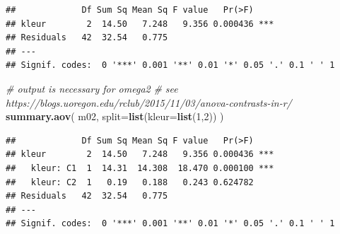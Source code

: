 \documentclass[
]{book}
\newenvironment{Shaded}{\begin{snugshade}}{\end{snugshade}}
\newcommand{\CommentTok}[1]{\textcolor[rgb]{0.56,0.35,0.01}{\textit{#1}}}
\newcommand{\DataTypeTok}[1]{\textcolor[rgb]{0.13,0.29,0.53}{#1}}
\newcommand{\DecValTok}[1]{\textcolor[rgb]{0.00,0.00,0.81}{#1}}
\newcommand{\KeywordTok}[1]{\textcolor[rgb]{0.13,0.29,0.53}{\textbf{#1}}}
\newcommand{\NormalTok}[1]{#1}
\newcommand{\OperatorTok}[1]{\textcolor[rgb]{0.81,0.36,0.00}{\textbf{#1}}}
\newcommand{\StringTok}[1]{\textcolor[rgb]{0.31,0.60,0.02}{#1}}
\begin{document}
\begin{Shaded}
\end{Shaded}

\begin{verbatim}
##             Df Sum Sq Mean Sq F value   Pr(>F)    
## kleur        2  14.50   7.248   9.356 0.000436 ***
## Residuals   42  32.54   0.775                     
## ---
## Signif. codes:  0 '***' 0.001 '**' 0.01 '*' 0.05 '.' 0.1 ' ' 1
\end{verbatim}

\begin{Shaded}
\begin{Highlighting}[]
\CommentTok{\# output is necessary for omega2}
\CommentTok{\# see https://blogs.uoregon.edu/rclub/2015/11/03/anova{-}contrasts{-}in{-}r/}
\KeywordTok{summary.aov}\NormalTok{( m02, }\DataTypeTok{split=}\KeywordTok{list}\NormalTok{(}\DataTypeTok{kleur=}\KeywordTok{list}\NormalTok{(}\DecValTok{1}\NormalTok{,}\DecValTok{2}\NormalTok{)) )}
\end{Highlighting}
\end{Shaded}

\begin{verbatim}
##             Df Sum Sq Mean Sq F value   Pr(>F)    
## kleur        2  14.50   7.248   9.356 0.000436 ***
##   kleur: C1  1  14.31  14.308  18.470 0.000100 ***
##   kleur: C2  1   0.19   0.188   0.243 0.624782    
## Residuals   42  32.54   0.775                     
## ---
## Signif. codes:  0 '***' 0.001 '**' 0.01 '*' 0.05 '.' 0.1 ' ' 1
\end{verbatim}
\end{document}
